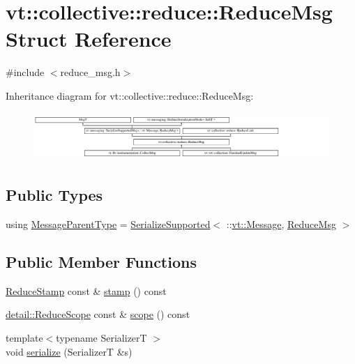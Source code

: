 \hypertarget{structvt_1_1collective_1_1reduce_1_1_reduce_msg}{}\section{vt\+:\+:collective\+:\+:reduce\+:\+:Reduce\+Msg Struct Reference}
\label{structvt_1_1collective_1_1reduce_1_1_reduce_msg}


{\ttfamily \#include $<$reduce\+\_\+msg.\+h$>$}

Inheritance diagram for vt\+:\+:collective\+:\+:reduce\+:\+:Reduce\+Msg\+:\begin{figure}[H]
\begin{center}
\leavevmode
\includegraphics[height=1.843621cm]{structvt_1_1collective_1_1reduce_1_1_reduce_msg}
\end{center}
\end{figure}
\subsection*{Public Types}
\begin{DoxyCompactItemize}
\item 
using \hyperlink{structvt_1_1collective_1_1reduce_1_1_reduce_msg_a5c736b83ddd821bdce047715e0b606f2}{Message\+Parent\+Type} = \hyperlink{namespacevt_a3862b8e3f67ab03f3a4313d828592fa9}{Serialize\+Supported}$<$ \+::\hyperlink{namespacevt_a3a3ddfef40b4c90915fa43cdd5f129ea}{vt\+::\+Message}, \hyperlink{structvt_1_1collective_1_1reduce_1_1_reduce_msg}{Reduce\+Msg} $>$
\end{DoxyCompactItemize}
\subsection*{Public Member Functions}
\begin{DoxyCompactItemize}
\item 
\hyperlink{namespacevt_1_1collective_1_1reduce_a7b7cb3021ac5654d92825d9fab0250b2}{Reduce\+Stamp} const  \& \hyperlink{structvt_1_1collective_1_1reduce_1_1_reduce_msg_a7b2f5ab707e75bc16a244759dfbecdd6}{stamp} () const
\item 
\hyperlink{structvt_1_1collective_1_1reduce_1_1detail_1_1_reduce_scope}{detail\+::\+Reduce\+Scope} const  \& \hyperlink{structvt_1_1collective_1_1reduce_1_1_reduce_msg_a7b31a26204ab86778a9058e42589e549}{scope} () const
\item 
{\footnotesize template$<$typename SerializerT $>$ }\\void \hyperlink{structvt_1_1collective_1_1reduce_1_1_reduce_msg_acd139b8eebfbd0ea925dac39032e5717}{serialize} (SerializerT \&s)
\end{DoxyCompactItemize}
